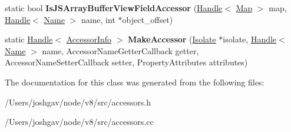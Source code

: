 \begin{DoxyCompactItemize}
\item 
static bool {\bfseries Is\+J\+S\+Array\+Buffer\+View\+Field\+Accessor} (\hyperlink{classv8_1_1internal_1_1_handle}{Handle}$<$ \hyperlink{classv8_1_1internal_1_1_map}{Map} $>$ map, \hyperlink{classv8_1_1internal_1_1_handle}{Handle}$<$ \hyperlink{classv8_1_1internal_1_1_name}{Name} $>$ name, int $\ast$object\+\_\+offset)\hypertarget{classv8_1_1internal_1_1_accessors_a168e807486046775d456de908f3c7d50}{}\label{classv8_1_1internal_1_1_accessors_a168e807486046775d456de908f3c7d50}

\item 
static \hyperlink{classv8_1_1internal_1_1_handle}{Handle}$<$ \hyperlink{classv8_1_1internal_1_1_accessor_info}{Accessor\+Info} $>$ {\bfseries Make\+Accessor} (\hyperlink{classv8_1_1internal_1_1_isolate}{Isolate} $\ast$isolate, \hyperlink{classv8_1_1internal_1_1_handle}{Handle}$<$ \hyperlink{classv8_1_1internal_1_1_name}{Name} $>$ name, Accessor\+Name\+Getter\+Callback getter, Accessor\+Name\+Setter\+Callback setter, Property\+Attributes attributes)\hypertarget{classv8_1_1internal_1_1_accessors_aadd6bb21bc0712cdf252a60170504385}{}\label{classv8_1_1internal_1_1_accessors_aadd6bb21bc0712cdf252a60170504385}

\end{DoxyCompactItemize}


The documentation for this class was generated from the following files\+:\begin{DoxyCompactItemize}
\item 
/\+Users/joshgav/node/v8/src/accessors.\+h\item 
/\+Users/joshgav/node/v8/src/accessors.\+cc\end{DoxyCompactItemize}
